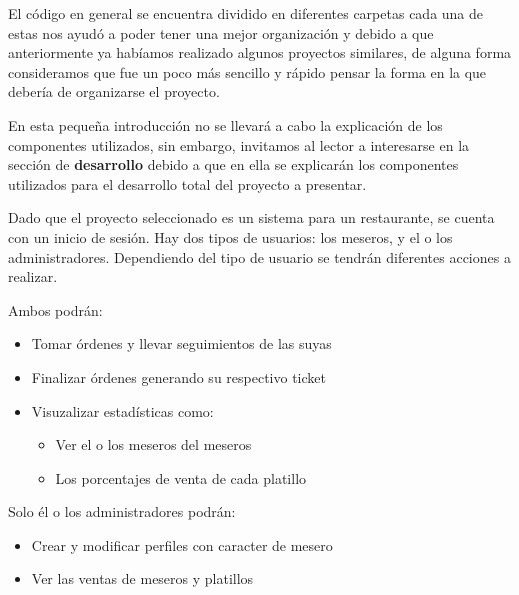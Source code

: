 El código en general se encuentra dividido en diferentes carpetas cada una de estas nos ayudó a poder 
tener una mejor organización y debido a que anteriormente ya habíamos realizado algunos proyectos similares, de alguna 
forma consideramos que fue un poco más sencillo y rápido pensar la forma en la que debería de organizarse el 
proyecto. 

En esta pequeña introducción no se llevará a cabo la explicación de los componentes utilizados, sin embargo,
invitamos al lector a interesarse en la sección de \textbf{desarrollo} debido a que en ella se explicarán 
los componentes utilizados para el desarrollo total del proyecto a presentar. 

Dado que el proyecto seleccionado es un sistema para un restaurante, se cuenta con un inicio de sesión. Hay dos tipos de usuarios:
los meseros, y el o los administradores. Dependiendo del tipo de usuario se tendrán diferentes acciones a realizar.

Ambos podrán:

\begin{itemize}
    \item Tomar órdenes y llevar seguimientos de las suyas
    \item Finalizar órdenes generando su respectivo ticket
    \item Visuzalizar estadísticas como:
    \begin{itemize}
        \item Ver el o los meseros del meseros
        \item Los porcentajes de venta de cada platillo
    \end{itemize}
\end{itemize}

Solo él o los administradores podrán:

\begin{itemize}
    \item Crear y modificar perfiles con caracter de mesero
    \item Ver las ventas de meseros y platillos
\end{itemize}


\pagebreak
